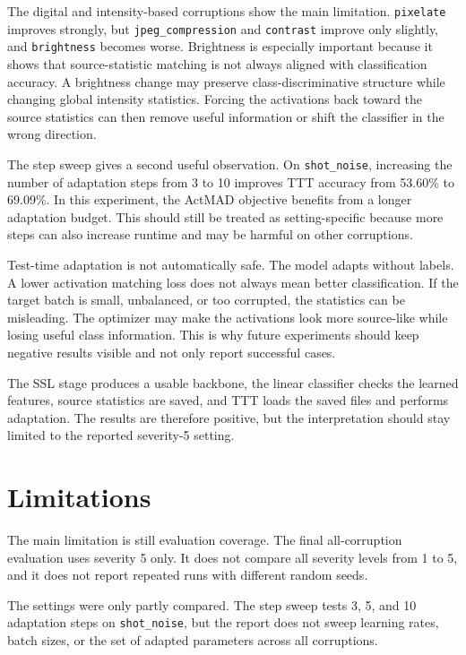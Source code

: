 \documentclass[a4paper,11pt]{article}
\begin{document}
The digital and intensity-based corruptions show the main limitation. \texttt{pixelate} improves strongly, but \texttt{jpeg\_compression} and \texttt{contrast} improve only slightly, and \texttt{brightness} becomes worse. Brightness is especially important because it shows that source-statistic matching is not always aligned with classification accuracy. A brightness change may preserve class-discriminative structure while changing global intensity statistics. Forcing the activations back toward the source statistics can then remove useful information or shift the classifier in the wrong direction.

The step sweep gives a second useful observation. On \texttt{shot\_noise}, increasing the number of adaptation steps from 3 to 10 improves TTT accuracy from 53.60\% to 69.09\%. In this experiment, the ActMAD objective benefits from a longer adaptation budget. This should still be treated as setting-specific because more steps can also increase runtime and may be harmful on other corruptions.

Test-time adaptation is not automatically safe. The model adapts without labels. A lower activation matching loss does not always mean better classification. If the target batch is small, unbalanced, or too corrupted, the statistics can be misleading. The optimizer may make the activations look more source-like while losing useful class information. This is why future experiments should keep negative results visible and not only report successful cases.

The SSL stage produces a usable backbone, the linear classifier checks the learned features, source statistics are saved, and TTT loads the saved files and performs adaptation. The results are therefore positive, but the interpretation should stay limited to the reported severity-5 setting.

\section{Limitations}

The main limitation is still evaluation coverage. The final all-corruption evaluation uses severity 5 only. It does not compare all severity levels from 1 to 5, and it does not report repeated runs with different random seeds.

The settings were only partly compared. The step sweep tests 3, 5, and 10 adaptation steps on \texttt{shot\_noise}, but the report does not sweep learning rates, batch sizes, or the set of adapted parameters across all corruptions.
\end{document}

